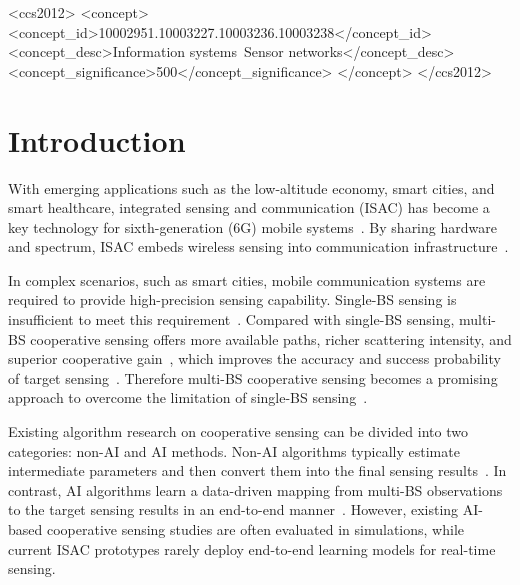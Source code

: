 \documentclass[sigconf]{acmart}
\begin{document}
\begin{CCSXML}
<ccs2012>
   <concept>
       <concept_id>10002951.10003227.10003236.10003238</concept_id>
       <concept_desc>Information systems~Sensor networks</concept_desc>
       <concept_significance>500</concept_significance>
       </concept>
 </ccs2012>
\end{CCSXML}




\maketitle

\section{Introduction}
With emerging applications such as the low-altitude economy, smart cities, and smart healthcare, integrated sensing and communication (ISAC) has become a key technology for sixth-generation (6G) mobile systems~\cite{Zhiqin21,ITU-R23}. By sharing hardware and spectrum, ISAC embeds wireless sensing into communication infrastructure~\cite{Zhiyong20}.

In complex scenarios, such as smart cities, mobile communication systems are required to provide high-precision sensing capability. Single-BS sensing is insufficient to meet this requirement~\cite{Andrew22}. Compared with single-BS sensing, multi-BS cooperative sensing offers more available paths, richer scattering intensity, and superior cooperative gain~\cite{Guangyi24, Zhiqing24}, which improves the accuracy and success probability of target sensing~\cite{Guoliang22, Wangjun22}. Therefore multi-BS cooperative sensing becomes a promising approach to overcome the limitation of
single-BS sensing~\cite{Zhiqing23}. 

Existing algorithm research on cooperative sensing can be divided into two categories: non-AI and AI methods. Non-AI algorithms typically estimate intermediate parameters and then convert them into the final sensing results~\cite{Zhang25, Jiapeng24}. In contrast, AI algorithms learn a data-driven mapping from multi-BS observations to the target sensing results in an end-to-end manner~\cite{Zihuan26, Hanting25}. However, existing AI-based cooperative sensing studies are often evaluated in simulations, while current ISAC prototypes rarely deploy end-to-end learning models for real-time sensing.
\end{document}
